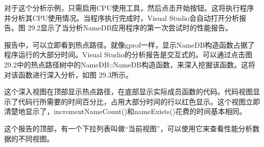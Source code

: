 对于这个分析示例，只需启用CPU使用工具，然后点击开始按钮。这将执行程序并分析其CPU使用情况。当程序执行完成时，Visual Studio会自动打开分析报告。图 29.2显示了当分析NameDB应用程序的第一次尝试时的性能报告。


报告中，可以立即看到热点路径。就像gprof一样，显示NameDB构造函数占据了程序运行的大部分时间。Visual Studio的分析报告是交互式的。可以通过点击图 29.2中的热点路径树中的NameDB::NameDB构造函数，来深入挖掘该函数。这将对该函数进行深入分析，如图 29.3所示。


这个深入视图在顶部显示热点路径，在底部显示实际成员函数的代码。代码视图显示了代码行所需要的时间百分比，占用大部分时间的行以红色显示。这个视图立即清楚地显示了，incrementNameCount()和nameExists()花费的时间基本相同。

这个报告的顶部，有一个下拉列表叫做“当前视图”，可以使用它来查看性能分析数据的不同视图。






